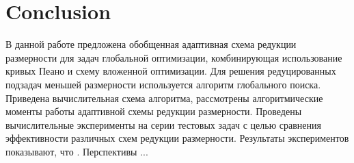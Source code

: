 \documentclass[runningheads]{llncs}
\begin{document}
\section{Conclusion}

В данной работе предложена обобщенная адаптивная схема редукции размерности для задач глобальной оптимизации, комбинирующая использование кривых Пеано и схему вложенной оптимизации. Для решения редуцированных подзадач меньшей размерности используется алгоритм глобального поиска. Приведена вычислительная схема алгоритма, рассмотрены алгоритмические моменты работы адаптивной схемы редукции размерности.
Проведены вычислительные эксперименты на серии тестовых задач с целью сравнения эффективности различных схем редукции размерности. 
Результаты экспериментов показывают, что . 
Перспективы ...


%
%
%
 
 
\end{document}
